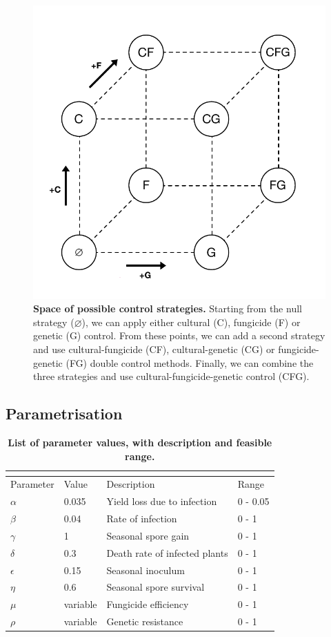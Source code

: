 \documentclass{article}
\begin{document}
\begin{figure}
\caption{\label{fig:cube}\textbf{Space of possible control strategies.} Starting from the null strategy ($\varnothing$), we can apply either cultural (C), fungicide (F) or genetic (G) control. From these points, we can add a second strategy and use cultural-fungicide (CF), cultural-genetic (CG) or fungicide-genetic (FG) double control methods. Finally, we can combine the three strategies and use cultural-fungicide-genetic control (CFG). }
\includegraphics[width=0.5\columnwidth]{SCL_Fig/SCL_Fig1.pdf}
\end{figure}


\subsection{Parametrisation}


%
\begin{table}[h]
\caption{\label{table:params}\textbf{List of parameter values, with description and feasible range.}}
\begin{tabular}{llll}%

	\multicolumn{4}{c}{}\\
	\hline
	Parameter & Value & Description & Range \\
	\hline
	$\alpha$ & 0.035 &Yield loss due to infection& 0 - 0.05\\
	$\beta$ & 0.04&Rate of infection& 0 - 1\\
	$\gamma$ & 1&Seasonal spore gain& 0 - 1\\
	$\delta$ &  0.3&Death rate of infected plants& 0 - 1\\
	$\epsilon$ & 0.15&Seasonal inoculum& 0 - 1\\
	$\eta$ & 0.6&Seasonal spore survival& 0 - 1\\
	$\mu$ & variable &Fungicide efficiency& 0 - 1\\
	$\rho$ & variable &Genetic resistance& 0 - 1\\
	\hline
\end{tabular}
\end{table}
\end{document}

